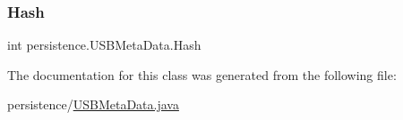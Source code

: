 \mbox{\label{classpersistence_1_1_u_s_b_meta_data_a85de1aae267979cebb86acacc2ea2d4e}} 
\subsubsection{\texorpdfstring{Hash}{Hash}}
{\footnotesize\ttfamily int persistence.\+U\+S\+B\+Meta\+Data.\+Hash\hspace{0.3cm}{\ttfamily [private]}}



The documentation for this class was generated from the following file\+:\begin{DoxyCompactItemize}
\item 
persistence/\mbox{\hyperlink{_u_s_b_meta_data_8java}{U\+S\+B\+Meta\+Data.\+java}}\end{DoxyCompactItemize}
